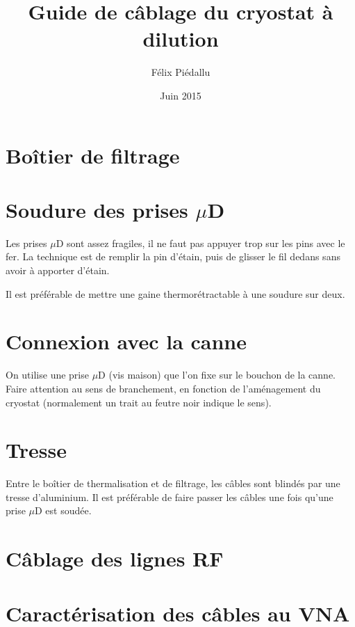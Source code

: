 \documentclass[a4paper,11pt]{article}
\title{Guide de câblage du cryostat à dilution}
\author{Félix Piédallu}
\date{Juin 2015}
\newcommand{\uD}{$\mu$D }
\begin{document}
\maketitle
\tableofcontents

%
\section{Boîtier de filtrage}


\section{Soudure des prises \uD}
Les prises \uD sont assez fragiles, il ne faut pas appuyer trop sur les pins avec le fer. La technique est de remplir la pin d'étain, puis de glisser le fil dedans sans avoir à apporter d'étain.

Il est préférable de mettre une gaine thermorétractable à une soudure sur deux.

\section{Connexion avec la canne}
On utilise une prise \uD (vis maison) que l'on fixe sur le bouchon de la canne. Faire attention au sens de branchement, en fonction de l'aménagement du cryostat (normalement un trait au feutre noir indique le sens).

\section{Tresse}
Entre le boîtier de thermalisation et de filtrage, les câbles sont blindés par une tresse d'aluminium. Il est préférable de faire passer les câbles une fois qu'une prise \uD est soudée.

\section{Câblage des lignes RF}


\section{Caractérisation des câbles au VNA}

\end{document}
